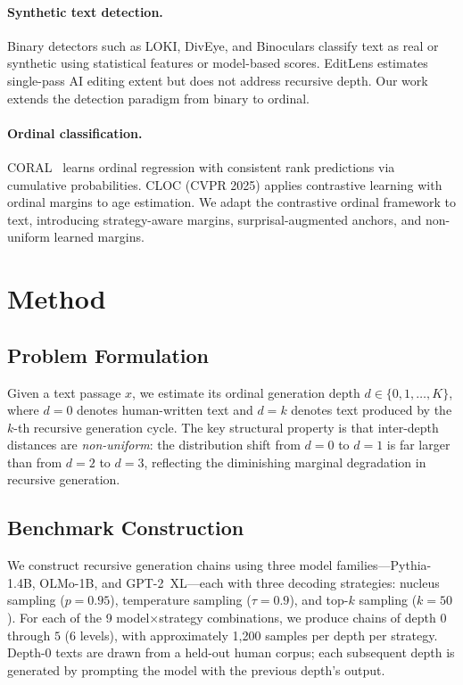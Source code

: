 \documentclass[11pt,a4paper]{article}
\begin{document}
\paragraph{Synthetic text detection.}
Binary detectors such as LOKI, DivEye, and Binoculars classify text as real or synthetic using statistical features or model-based scores.
EditLens estimates single-pass AI editing extent but does not address recursive depth.
Our work extends the detection paradigm from binary to ordinal.

\paragraph{Ordinal classification.}
CORAL~\cite{cao2020coral} learns ordinal regression with consistent rank predictions via cumulative probabilities.
CLOC (CVPR 2025) applies contrastive learning with ordinal margins to age estimation.
We adapt the contrastive ordinal framework to text, introducing strategy-aware margins, surprisal-augmented anchors, and non-uniform learned margins.

\section{Method}
\label{sec:method}

\subsection{Problem Formulation}

Given a text passage $x$, we estimate its ordinal generation depth $d \in \{0, 1, \ldots, K\}$, where $d=0$ denotes human-written text and $d=k$ denotes text produced by the $k$-th recursive generation cycle.
The key structural property is that inter-depth distances are \emph{non-uniform}: the distribution shift from $d=0$ to $d=1$ is far larger than from $d=2$ to $d=3$, reflecting the diminishing marginal degradation in recursive generation.

\subsection{Benchmark Construction}

We construct recursive generation chains using three model families---Pythia-1.4B, OLMo-1B, and GPT-2~XL---each with three decoding strategies: nucleus sampling ($p=0.95$), temperature sampling ($\tau=0.9$), and top-$k$ sampling ($k=50$).
For each of the 9 model$\times$strategy combinations, we produce chains of depth $0$ through $5$ (6 levels), with approximately 1{,}200 samples per depth per strategy.
Depth-$0$ texts are drawn from a held-out human corpus; each subsequent depth is generated by prompting the model with the previous depth's output.
\end{document}
